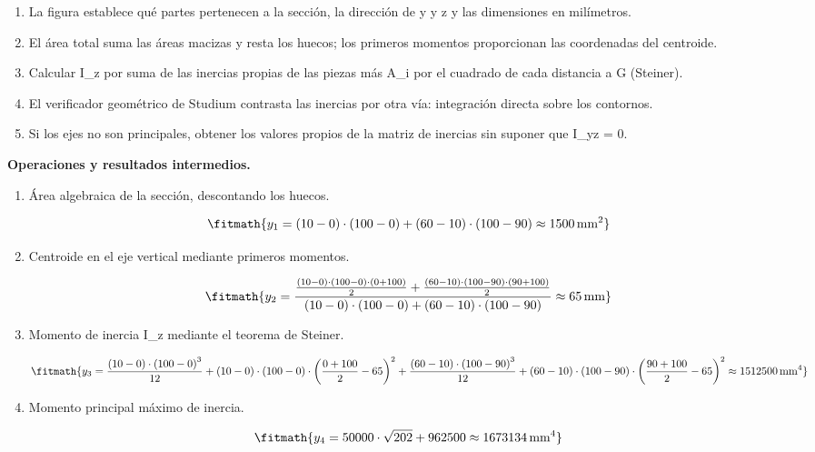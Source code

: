 \begin{enumerate}

\item La figura establece qué partes pertenecen a la sección, la dirección de y y z y las dimensiones en milímetros.

\item El área total suma las áreas macizas y resta los huecos; los primeros momentos proporcionan las coordenadas del centroide.

\item Calcular I\_z por suma de las inercias propias de las piezas más A\_i por el cuadrado de cada distancia a G (Steiner).

\item El verificador geométrico de Studium contrasta las inercias por otra vía: integración directa sobre los contornos.

\item Si los ejes no son principales, obtener los valores propios de la matriz de inercias sin suponer que I\_yz = 0.

\end{enumerate}

\noindent\textbf{Operaciones y resultados intermedios.}

\begin{enumerate}

\item Área algebraica de la sección, descontando los huecos.

\[\fitmath{y_{1}=\left(10-0\right)\cdot \left(100-0\right)+\left(60-10\right)\cdot \left(100-90\right)\approx 1500\,\mathrm{mm^{2}}}\]

\item Centroide en el eje vertical mediante primeros momentos.

\[\fitmath{y_{2}=\frac{\frac{\left(10-0\right)\cdot \left(100-0\right)\cdot \left(0+100\right)}{2}+\frac{\left(60-10\right)\cdot \left(100-90\right)\cdot \left(90+100\right)}{2}}{\left(10-0\right)\cdot \left(100-0\right)+\left(60-10\right)\cdot \left(100-90\right)}\approx 65\,\mathrm{mm}}\]

\item Momento de inercia I\_z mediante el teorema de Steiner.

\[\fitmath{y_{3}=\frac{\left(10-0\right)\cdot {\left(100-0\right)}^{3}}{12}+\left(10-0\right)\cdot \left(100-0\right)\cdot {\left(\frac{0+100}{2}-65\right)}^{2}+\frac{\left(60-10\right)\cdot {\left(100-90\right)}^{3}}{12}+\left(60-10\right)\cdot \left(100-90\right)\cdot {\left(\frac{90+100}{2}-65\right)}^{2}\approx 1512500\,\mathrm{mm^{4}}}\]

\item Momento principal máximo de inercia.

\[\fitmath{y_{4}=50000\cdot \sqrt{202}+962500\approx 1673134\,\mathrm{mm^{4}}}\]

\end{enumerate}
